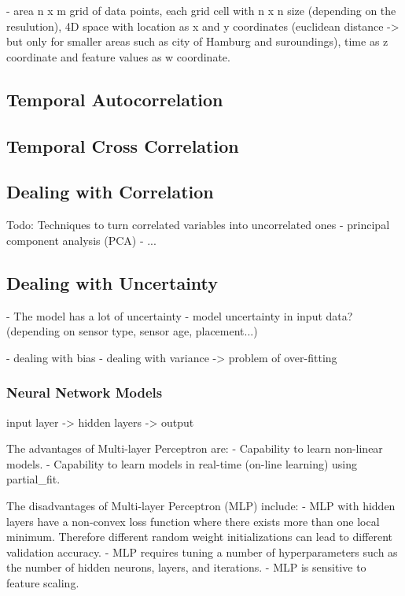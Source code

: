 - area n x m grid of data points, each grid cell with n x n size (depending on the resulution), 4D space with location as x and y coordinates (euclidean distance -> but only for smaller areas such as city of Hamburg and suroundings), time as z coordinate and feature values as w coordinate.\\

\subsection{Temporal Autocorrelation}


\subsection{Temporal Cross Correlation}

\subsection{Dealing with Correlation}
\label{subsec:Dealing with Correlation}

Todo: Techniques to turn correlated variables into uncorrelated ones
- principal component analysis (PCA)
- ...

\subsection{Dealing with Uncertainty}
- The model has a lot of uncertainty
- model uncertainty in input data? (depending on sensor type, sensor age, placement...)

- dealing with bias
- dealing with variance
-> problem of over-fitting

\subsubsection{Neural Network Models}
input layer -> hidden layers -> output

The advantages of Multi-layer Perceptron are:
- Capability to learn non-linear models.
- Capability to learn models in real-time (on-line learning) using partial\_fit.

The disadvantages of Multi-layer Perceptron (MLP) include:
- MLP with hidden layers have a non-convex loss function where there exists more than one local minimum. Therefore different random weight initializations can lead to different validation accuracy.
- MLP requires tuning a number of hyperparameters such as the number of hidden neurons, layers, and iterations.
- MLP is sensitive to feature scaling.

